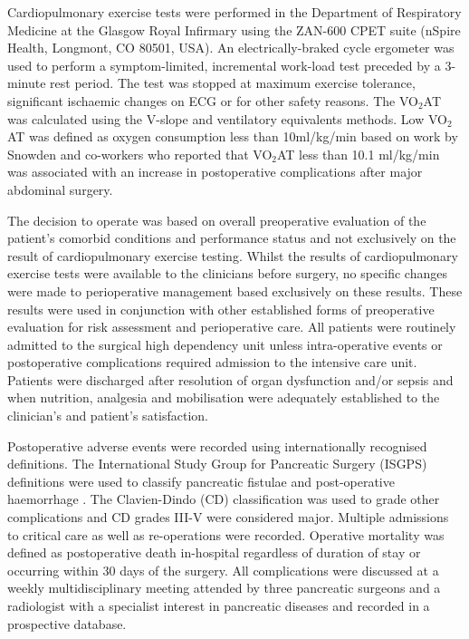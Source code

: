 Cardiopulmonary exercise tests were performed in the Department of Respiratory Medicine at the Glasgow Royal Infirmary using the ZAN-600 CPET suite (nSpire Health, Longmont, CO 80501, USA). 
An electrically-braked cycle ergometer was used to perform a symptom-limited, incremental work-load test preceded by a 3-minute rest period. 
The test was stopped at maximum exercise tolerance, significant ischaemic changes on ECG or for other safety reasons. 
The VO$_2$AT was calculated using the V-slope \parencite{beaver_new_1986, sue_metabolic_1988} and ventilatory equivalents \parencite{sue_metabolic_1988} methods. 
Low VO$_2$AT was defined as oxygen consumption less than 10ml/kg/min based on work by Snowden and co-workers \parencite{snowden_submaximal_2010} who reported that VO$_2$AT less than 10.1 ml/kg/min was associated with an increase in postoperative complications after major abdominal surgery.

The decision to operate was based on overall preoperative evaluation of the patient’s comorbid conditions and performance status and not exclusively on the result of cardiopulmonary exercise testing. 
Whilst the results of cardiopulmonary exercise tests were available to the clinicians before surgery, no specific changes were made to perioperative management based exclusively on these results. 
These results were used in conjunction with other established forms of preoperative evaluation for risk assessment and perioperative care. 
All patients were routinely admitted to the surgical high dependency unit unless intra-operative events or postoperative complications required admission to the intensive care unit. 
Patients were discharged after resolution of organ dysfunction and/or sepsis and when nutrition, analgesia and mobilisation were adequately established to the clinician's and patient's satisfaction.

Postoperative adverse events were recorded using internationally recognised definitions. 
The International Study Group for Pancreatic Surgery (ISGPS) definitions were used to classify pancreatic fistulae \parencite{bassi_postoperative_2005} and post-operative haemorrhage \parencite{wente_postpancreatectomy_2007}. 
The Clavien-Dindo (CD) classification \parencite{clavien_clavien-dindo_2009, dindo_classification_2004} was used to grade other complications and CD grades III-V were considered major. 
Multiple admissions to critical care as well as re-operations were recorded. 
Operative mortality was defined as postoperative death in-hospital regardless of duration of stay or occurring within 30 days of the surgery. 
All complications were discussed at a weekly multidisciplinary meeting attended by three pancreatic surgeons and a radiologist with a specialist interest in pancreatic diseases and recorded in a prospective database.

